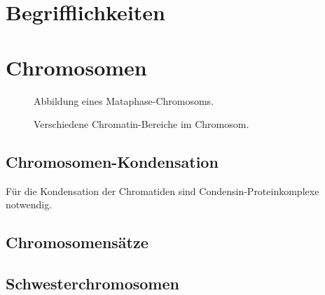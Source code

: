 
\section{Begrifflichkeiten}

\section{Chromosomen}

\begin{figure}[H]
    \caption{Abbildung eines Mataphase-Chromosoms.}\label{fig:figure}
\end{figure}



\begin{figure}[H]
    \caption{Verschiedene Chromatin-Bereiche im Chromosom.}\label{fig:figure}
\end{figure}

\subsection{Chromosomen-Kondensation}
Für die Kondensation der Chromatiden sind Condensin-Proteinkomplexe notwendig.



\subsection{Chromosomensätze}



\subsection{Schwesterchromosomen}


